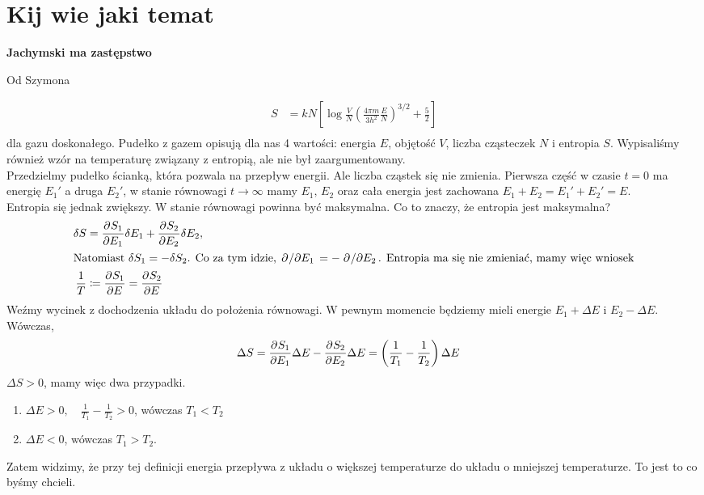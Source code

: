 \documentclass[12pt,a4paper]{report}
\newcommand{\com}[1]{{\color{red} #1}}
\renewcommand{\emph}{\textbf}
\newenvironment{lecture}[1]{\par\medskip
   \noindent\chapter{#1} \rmfamily}{\medskip}
\begin{document}
\begin{lecture}{Kij wie jaki temat}

\emph{Jachymski ma zastępstwo}

\com{Od Szymona}

\begin{align*}
	S &= k N \left[ \log \frac{V}{N} \left( \frac{4 \pi m}{3 h^2} \frac{E}{N} \right)^{3 /2}  + \frac{5}{2}  \right]  \\
\end{align*}
dla gazu doskonałego. Pudełko z gazem opisują dla nas 4 wartości: energia $E$, objętość $V$, liczba cząsteczek $N$ i entropia $S$. Wypisaliśmy również wzór na temperaturę związany z entropią, ale nie był zaargumentowany. \\

Przedzielmy pudełko ścianką, która pozwala na przepływ energii. Ale liczba cząstek się nie zmienia. Pierwsza część w czasie $t=0$ ma energię $E_1'$ a druga $E_2'$, w stanie równowagi $t \to \infty$ mamy $E_1, \, E_2$ oraz cała energia jest zachowana $E_1+ E_2 = E_1' + E_2' = E$. \\
Entropia się jednak zwiększy. W stanie równowagi powinna być maksymalna. Co to znaczy, że entropia jest maksymalna?
\begin{align*}
	\delta S &=  \pdv[]{S_1}{{E_1}} \delta E_1 + \pdv[]{S_2}{{E_2}} \delta E_2, \\
	\intertext{Natomiast $\delta S_1 = - \delta S_2$. Co za tym idzie, $\pdv*[]{}{{E_1}} = - \pdv*[]{}{{E_2}} $. Entropia ma się nie zmieniać, mamy więc wniosek}
	\frac{1}{T} &\coloneq \pdv[]{S_1}{{E}} = \pdv[]{S_2}{{E}} 
\end{align*}
Weźmy wycinek z dochodzenia układu do położenia równowagi. W pewnym momencie będziemy mieli energie $E_1 + \Delta E $ i $E_2 - \Delta E$. Wówczas,
\begin{align*}
	\Delta S &= \pdv[]{S_1}{{E_1}} \Delta E - \pdv[]{S_2}{{E_2}}  \Delta E = \left( \frac{1}{ T_1} - \frac{1}{T_2} \right) \Delta E  
\end{align*}
$\Delta S >0$, mamy więc dwa przypadki.
\begin{enumerate}
	\item $\displaystyle{\Delta E >0, \quad \frac{1}{T_1} - \frac{1}{T_2} >0}$, wówczas $T_1 < T_2$
	\item $\Delta E < 0$, wówczas $T_1 > T_2$. 
\end{enumerate}
Zatem widzimy, że przy tej definicji energia przepływa z układu o większej temperaturze do układu o mniejszej temperaturze. To jest to co byśmy chcieli. \\


\end{lecture}
\end{document}
